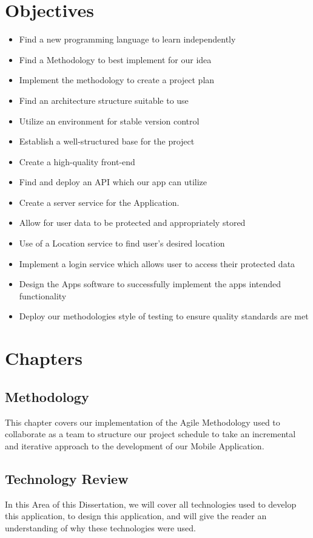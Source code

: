 \section{Objectives}
\begin{itemize}
    \item Find a new programming language to learn independently
    \item Find a Methodology to best implement for our idea
    \item Implement the methodology to create a project plan
    \item Find an architecture structure suitable to use
    \item Utilize an environment for stable version control
    \item Establish a well-structured base for the project
    \item Create a high-quality front-end
    \item Find and deploy an API which our app can utilize
    \item Create a server service for the Application.
    \item Allow for user data to be protected and appropriately stored
    \item Use of a Location service to find user's desired location
    \item Implement a login service which allows user to access their protected data
    \item Design the Apps software to successfully implement the apps intended functionality
    \item Deploy our methodologies style of testing to ensure quality standards are met

\end{itemize}
\section{Chapters}
\subsection{Methodology}
This chapter covers our implementation of the Agile Methodology used to collaborate as a team to structure our project schedule to take an incremental and iterative approach to the development of our Mobile Application.
\subsection{Technology Review}
In this Area of this Dissertation, we will cover all technologies used to develop this application, to design this application, and will give the reader an understanding of why these technologies were used.
